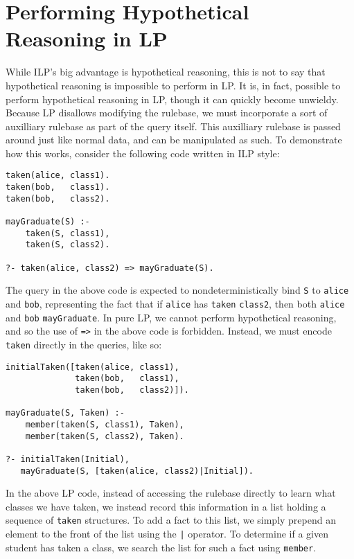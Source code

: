 \section{Performing Hypothetical Reasoning in LP}
While ILP's big advantage is hypothetical reasoning, this is not to say that hypothetical reasoning is impossible to perform in LP.
It is, in fact, possible to perform hypothetical reasoning in LP, though it can quickly become unwieldy.
Because LP disallows modifying the rulebase, we must incorporate a sort of auxilliary rulebase as part of the query itself.
This auxilliary rulebase is passed around just like normal data, and can be manipulated as such.
To demonstrate how this works, consider the following code written in ILP style:

\begin{verbatim}
taken(alice, class1).
taken(bob,   class1).
taken(bob,   class2).

mayGraduate(S) :-
    taken(S, class1),
    taken(S, class2).

?- taken(alice, class2) => mayGraduate(S).
\end{verbatim}

The query in the above code is expected to nondeterministically bind \texttt{S} to \texttt{alice} and \texttt{bob}, representing the fact that if \texttt{alice} has \texttt{taken} \texttt{class2}, then both \texttt{alice} and \texttt{bob} \texttt{mayGraduate}.
In pure LP, we cannot perform hypothetical reasoning, and so the use of \texttt{=>} in the above code is forbidden.
Instead, we must encode \texttt{taken} directly in the queries, like so:

\begin{verbatim}
initialTaken([taken(alice, class1),
              taken(bob,   class1),
              taken(bob,   class2)]).

mayGraduate(S, Taken) :-
    member(taken(S, class1), Taken),
    member(taken(S, class2), Taken).

?- initialTaken(Initial),
   mayGraduate(S, [taken(alice, class2)|Initial]).
\end{verbatim}

In the above LP code, instead of accessing the rulebase directly to learn what classes we have taken, we instead record this information in a list holding a sequence of \texttt{taken} structures.
To add a fact to this list, we simply prepend an element to the front of the list using the \texttt{|} operator.
To determine if a given student has taken a class, we search the list for such a fact using \texttt{member}.

